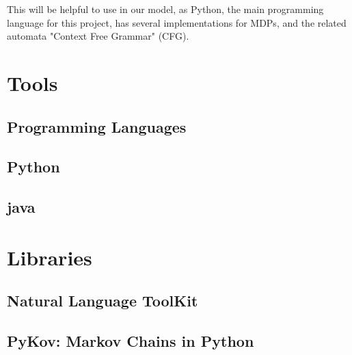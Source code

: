 \documentclass[onecolumn, draftclsnofoot,10pt, compsoc]{IEEEtran}
\begin{document}
  This will be helpful to use in our model, as Python, the main programming language for this project, has several implementations for MDPs, and the related automata "Context Free Grammar" (CFG).
\section{Tools}

  \subsection{Programming Languages}
  \subsection{Python}
  \subsection{java}

\section{Libraries}
  \subsection{Natural Language ToolKit}
  \subsection{PyKov: Markov Chains in Python}


\pagebreak




\end{document}

